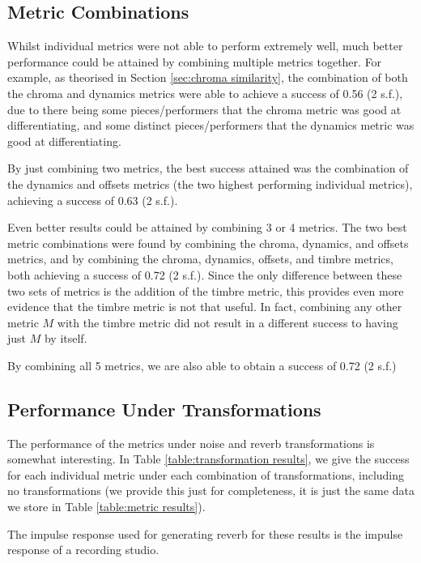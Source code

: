 \documentclass[oneside, class=book, 12pt, crop=false]{standalone}
\begin{document}

\subsection{Metric Combinations}

Whilst individual metrics were not able to perform extremely well, much better performance could be attained by combining multiple metrics together. For example, as theorised in Section \ref{sec:chroma similarity}, the combination of both the chroma and dynamics metrics were able to achieve a success of 0.56 (2 s.f.), due to there being some pieces/performers that the chroma metric was good at differentiating, and some distinct pieces/performers that the dynamics metric was good at differentiating.

By just combining two metrics, the best success attained was the combination of the dynamics and offsets metrics (the two highest performing individual metrics), achieving a success of 0.63 (2 s.f.).

Even better results could be attained by combining 3 or 4 metrics. The two best metric combinations were found by combining the chroma, dynamics, and offsets metrics, and by combining the chroma, dynamics, offsets, and timbre metrics, both achieving a success of 0.72 (2 s.f.). Since the only difference between these two sets of metrics is the addition of the timbre metric, this provides even more evidence that the timbre metric is not that useful. In fact, combining any other metric $M$ with the timbre metric did not result in a different success to having just $M$ by itself.

By combining all 5 metrics, we are also able to obtain a success of 0.72 (2 s.f.)

\subsection{Performance Under Transformations}

The performance of the metrics under noise and reverb transformations is somewhat interesting. In Table \ref{table:transformation results}, we give the success for each individual metric under each combination of transformations, including no transformations (we provide this just for completeness, it is just the same data we store in Table \ref{table:metric results}).

The impulse response used for generating reverb for these results is the impulse response of a recording studio.
\end{document}

